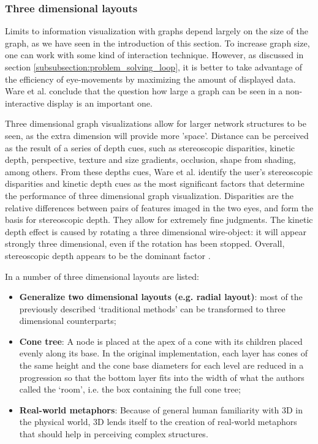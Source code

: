 \subsubsection{Three dimensional layouts}\label{chapter:literature_study:section:interaction:subsection:graphs:subsubsection:threed}

Limits to information visualization with graphs depend largely on the size of the graph, as we have seen in the introduction of this section. To increase graph size, one can work with some kind of interaction technique\cite{herman:2000, ware:2008}. However, as discussed in section \ref{subsubsection:problem_solving_loop}, it is better to take advantage of the efficiency of eye-movements by maximizing the amount of displayed data\cite{ware:2004, ware:2008}. Ware et al. conclude that the question how large a graph can be seen in a non-interactive display is an important one\cite{ware:2008}.

Three dimensional graph visualizations allow for larger network structures to be seen, as the extra dimension will provide more 'space'\cite{herman:2000, ware:2008}. Distance can be perceived as the result of a series of depth cues, such as stereoscopic disparities, kinetic depth, perspective, texture and size gradients, occlusion, shape from shading, among others. From these depths cues, Ware et al. \cite{ware:2008} identify the user's stereoscopic disparities and kinetic depth cues as the most significant factors that determine the performance of three dimensional graph visualization. Disparities are the relative differences between pairs of features imaged in the two eyes, and form the basis for stereoscopic depth. They allow for extremely fine judgments. The kinetic depth effect is caused by rotating a three dimensional wire-object: it will appear strongly three dimensional, even if the rotation has been stopped. Overall, stereoscopic depth appears to be the dominant factor \cite{ware:2008}.

In \cite{herman:2000} a number of three dimensional layouts are listed:

\begin{itemize}
	\item \textbf{Generalize two dimensional layouts} \textbf{(e.g. radial layout)}: most of the previously described ‘traditional methods’ can be transformed to three dimensional counterparts;
	\item \textbf{Cone tree}: A node is placed at the apex of a cone with its children placed evenly along its base. In the original implementation, each layer has cones of the same height and the cone base diameters for each level are reduced in a progression so that the bottom layer fits into the width of what the authors called the ‘room’, i.e. the box containing the full cone tree;
	\item \textbf{Real-world metaphors}: Because of general human familiarity with 3D in the physical world, 3D lends itself to the creation of real-world metaphors that should help in perceiving complex structures.
\end{itemize}


